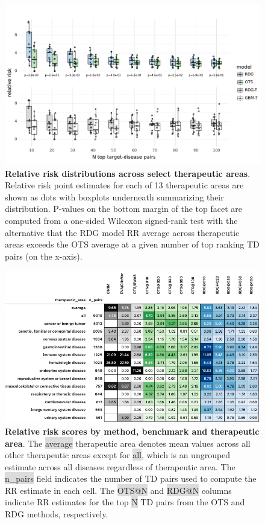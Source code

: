 \documentclass{article}
\begin{document}
\begin{figure}[H]
  \centering
  \captionsetup{width=.9\linewidth}
  \includegraphics[width=1\textwidth]{relative_risk_dist_across_ta.pdf}
  \caption{
    \textbf{Relative risk distributions across select therapeutic areas}.
    Relative risk point estimates for each of 13 therapeutic areas are shown as dots with boxplots underneath summarizing their distribution. P-values on the bottom margin of the top facet are computed from a one-sided Wilcoxon signed-rank test with the alternative that the RDG model RR average across therapeutic areas exceeds the OTS average at a given number of top ranking TD pairs (on the x-axis).
  }
  \label{fig:relative_risk_dist_across_ta}
\end{figure}
  
\pagebreak

\begin{figure}[H]
  \centering
  \captionsetup{width=.9\linewidth}
  \includegraphics[width=1\textwidth]{relative_risk_by_ta.png}
  \caption{
    \textbf{Relative risk scores by method, benchmark and therapeutic area}.
    The \colorbox{Gainsboro}{average} therapeutic area denotes mean values across all other therapeutic areas except for \colorbox{Gainsboro}{all}, which is an ungrouped estimate across all diseases regardless of therapeutic area. The \colorbox{Gainsboro}{n\_pairs} field indicates the number of TD pairs used to compute the RR estimate in each cell. The \colorbox{Gainsboro}{OTS@N} and \colorbox{Gainsboro}{RDG@N} columns indicate RR estimates for the top \colorbox{Gainsboro}{N} TD pairs from the OTS and RDG methods, respectively.
  }
  \label{fig:relative_risk_by_ta}
\end{figure}
\end{document}
